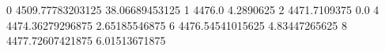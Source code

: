0 4509.77783203125 38.06689453125
1 4476.0 4.2890625
2 4471.7109375 0.0
4 4474.36279296875 2.65185546875
6 4476.54541015625 4.83447265625
8 4477.72607421875 6.01513671875
